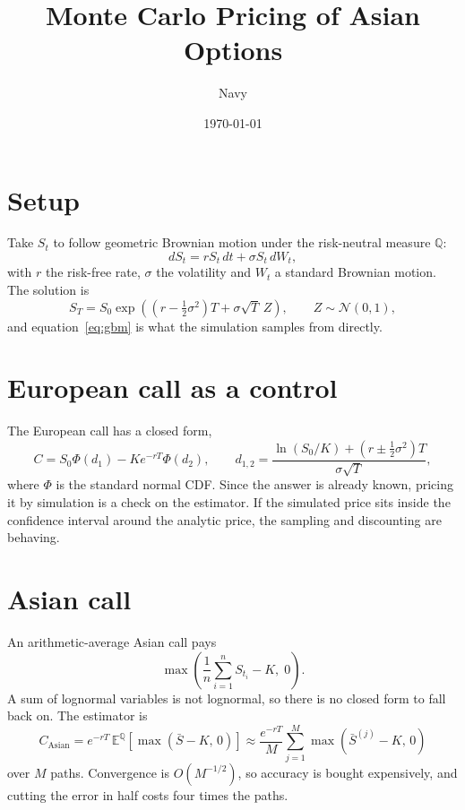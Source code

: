 \documentclass[11pt,a4paper]{article}
\title{Monte Carlo Pricing of Asian Options}
\author{Navy}
\date{\today}
\begin{document}
\maketitle

\section{Setup}

Take $S_t$ to follow geometric Brownian motion under the risk-neutral measure
$\mathbb{Q}$:
%
\begin{equation}
    dS_t = r S_t \, dt + \sigma S_t \, dW_t ,
\end{equation}
%
with $r$ the risk-free rate, $\sigma$ the volatility and $W_t$ a standard
Brownian motion. The solution is
%
\begin{equation}
    S_T = S_0 \exp\!\left( \left(r - \tfrac{1}{2}\sigma^2\right) T
          + \sigma \sqrt{T}\, Z \right),
    \qquad Z \sim \mathcal{N}(0,1),
    \label{eq:gbm}
\end{equation}
%
and equation~\eqref{eq:gbm} is what the simulation samples from directly.

\section{European call as a control}

The European call has a closed form,
%
\begin{equation}
    C = S_0 \Phi(d_1) - K e^{-rT} \Phi(d_2),
    \qquad
    d_{1,2} = \frac{\ln(S_0/K) + \left(r \pm \tfrac{1}{2}\sigma^2\right)T}
                   {\sigma\sqrt{T}},
\end{equation}
%
where $\Phi$ is the standard normal CDF. Since the answer is already known,
pricing it by simulation is a check on the estimator. If the simulated price sits inside the confidence interval
around the analytic price, the sampling and discounting are behaving.

\section{Asian call}

An arithmetic-average Asian call pays
%
\begin{equation}
    \max\!\left( \frac{1}{n}\sum_{i=1}^{n} S_{t_i} - K,\; 0 \right).
\end{equation}
%
A sum of lognormal variables is not lognormal, so there is no closed form to
fall back on. The estimator is
%
\begin{equation}
    C_{\text{Asian}} = e^{-rT}\, \mathbb{E}^{\mathbb{Q}}
        \!\left[ \max\!\left( \bar{S} - K,\, 0 \right) \right]
    \approx \frac{e^{-rT}}{M} \sum_{j=1}^{M}
        \max\!\left( \bar{S}^{(j)} - K,\, 0 \right)
\end{equation}
%
over $M$ paths. Convergence is $O(M^{-1/2})$, so accuracy
is bought expensively, and cutting the error in half costs four times the paths.
\end{document}
